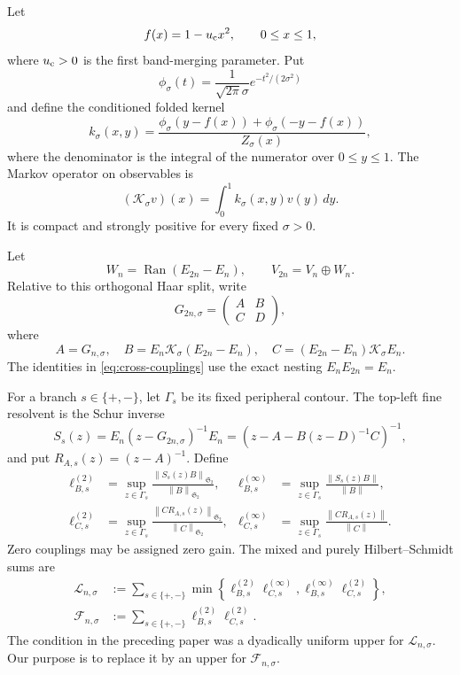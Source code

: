 \documentclass[11pt]{article}
\theoremstyle{definition}
\theoremstyle{remark}
\newcommand{\C}{\mathbb C}
\newcommand{\cK}{\mathcal K}
\newcommand{\cF}{\mathcal F}
\newcommand{\cL}{\mathcal L}
\newcommand{\HS}{\mathfrak S_2}
\newcommand{\norm}[1]{\left\lVert #1\right\rVert}
\begin{document}
Let
\begin{equation}
 f(x)=1-u_{\rm c}x^2,
 \qquad 0\le x\le1,
 \label{eq:quadratic-map}
\end{equation}
where \(u_{\rm c}>0\) is the first band-merging parameter.  Put
\[
 \phi_\sigma(t)=\frac{1}{\sqrt{2\pi}\sigma}
 e^{-t^2/(2\sigma^2)}
\]
and define the conditioned folded kernel
\begin{equation}
 k_\sigma(x,y)
 =\frac{\phi_\sigma(y-f(x))+\phi_\sigma(-y-f(x))}
 {Z_\sigma(x)},
 \label{eq:folded-kernel}
\end{equation}
where the denominator is the integral of the numerator over \(0\le y\le1\).
The Markov operator on observables is
\begin{equation}
 (\cK_\sigma v)(x)=\int_0^1k_\sigma(x,y)v(y)\,dy.
 \label{eq:markov-operator}
\end{equation}
It is compact and strongly positive for every fixed \(\sigma>0\).

Let
\[
 W_n=\operatorname{Ran}(E_{2n}-E_n),
 \qquad
 V_{2n}=V_n\oplus W_n.
\]
Relative to this orthogonal Haar split, write
\begin{equation}
 G_{2n,\sigma}
 =\begin{pmatrix}A&B\\C&D\end{pmatrix},
 \label{eq:haar-blocks}
\end{equation}
where
\begin{equation}
 A=G_{n,\sigma},\quad
 B=E_n\cK_\sigma(E_{2n}-E_n),\quad
 C=(E_{2n}-E_n)\cK_\sigma E_n.
 \label{eq:cross-couplings}
\end{equation}
The identities in \eqref{eq:cross-couplings} use the exact nesting
\(E_nE_{2n}=E_n\).

For a branch \(s\in\{+,-\}\), let \(\Gamma_s\) be its fixed peripheral
contour.  The top-left fine resolvent is the Schur inverse
\[
 S_s(z)=E_n(z-G_{2n,\sigma})^{-1}E_n
       =(z-A-B(z-D)^{-1}C)^{-1},
\]
and put \(R_{A,s}(z)=(z-A)^{-1}\).  Define
\begin{align}
 \ell_{B,s}^{(2)}
 &=\sup_{z\in\Gamma_s}
   \frac{\norm{S_s(z)B}_{\HS}}{\norm B_{\HS}},
 &
 \ell_{B,s}^{(\infty)}
 &=\sup_{z\in\Gamma_s}
   \frac{\norm{S_s(z)B}}{\norm B},
 \label{eq:left-gains}\\
 \ell_{C,s}^{(2)}
 &=\sup_{z\in\Gamma_s}
   \frac{\norm{CR_{A,s}(z)}_{\HS}}{\norm C_{\HS}},
 &
 \ell_{C,s}^{(\infty)}
 &=\sup_{z\in\Gamma_s}
   \frac{\norm{CR_{A,s}(z)}}{\norm C}.
 \label{eq:right-gains}
\end{align}
Zero couplings may be assigned zero gain.  The mixed and purely
Hilbert--Schmidt sums are
\begin{align}
 \cL_{n,\sigma}
 &:=\sum_{s\in\{+,-\}}
 \min\left\{
 \ell_{B,s}^{(2)}\ell_{C,s}^{(\infty)},
 \ell_{B,s}^{(\infty)}\ell_{C,s}^{(2)}
 \right\},
 \label{eq:mixed-gain}\\
 \cF_{n,\sigma}
 &:=\sum_{s\in\{+,-\}}
 \ell_{B,s}^{(2)}\ell_{C,s}^{(2)}.
 \label{eq:hs-gain}
\end{align}
The condition in the preceding paper was a dyadically uniform upper for
\(\cL_{n,\sigma}\).  Our purpose is to replace it by an upper for
\(\cF_{n,\sigma}\).
\end{document}
